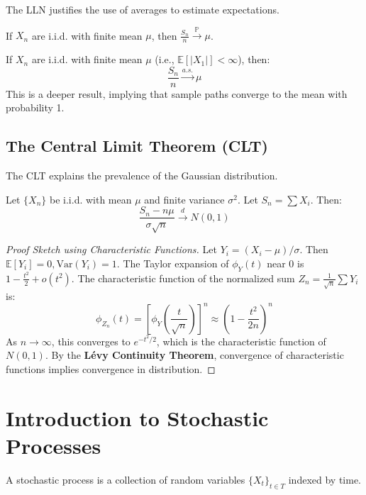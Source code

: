 \documentclass[oneside]{book}
\begin{document}
The LLN justifies the use of averages to estimate expectations.

\begin{theorem}
If $X_n$ are i.i.d. with finite mean $\mu$, then $\frac{S_n}{n} \xrightarrow{\mathbb{P}} \mu$.
\end{theorem}

\begin{theorem}
If $X_n$ are i.i.d. with finite mean $\mu$ (i.e., $\mathbb{E}[|X_1|] < \infty$), then:
\[ \frac{S_n}{n} \xrightarrow{a.s.} \mu \]
This is a deeper result, implying that sample paths converge to the mean with probability 1.
\end{theorem}

\subsection{The Central Limit Theorem (CLT)}

The CLT explains the prevalence of the Gaussian distribution.

\begin{theorem}
Let $\{X_n\}$ be i.i.d. with mean $\mu$ and finite variance $\sigma^2$. Let $S_n = \sum X_i$. Then:
\[ \frac{S_n - n\mu}{\sigma\sqrt{n}} \xrightarrow{d} N(0, 1) \]
\end{theorem}

\begin{proof}[Proof Sketch using Characteristic Functions]
Let $Y_i = (X_i - \mu)/\sigma$. Then $\mathbb{E}[Y_i]=0, \text{Var}(Y_i)=1$.
The Taylor expansion of $\phi_Y(t)$ near 0 is $1 - \frac{t^2}{2} + o(t^2)$.
The characteristic function of the normalized sum $Z_n = \frac{1}{\sqrt{n}}\sum Y_i$ is:
\[ \phi_{Z_n}(t) = \left[ \phi_Y\left(\frac{t}{\sqrt{n}}\right) \right]^n \approx \left( 1 - \frac{t^2}{2n} \right)^n \]
As $n \to \infty$, this converges to $e^{-t^2/2}$, which is the characteristic function of $N(0,1)$. By the \textbf{Lévy Continuity Theorem}, convergence of characteristic functions implies convergence in distribution.
\end{proof}

\section{Introduction to Stochastic Processes}

A stochastic process is a collection of random variables $\{X_t\}_{t \in T}$ indexed by time.
\end{document}
